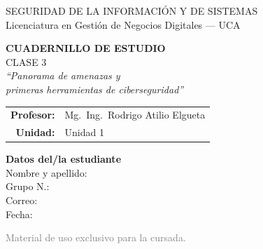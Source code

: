 \documentclass[12pt,a4paper]{article}
\begin{document}
\begin{titlepage}
\centering
\vspace*{1cm}

\begin{cajaTitulo}[width=\textwidth, halign=center]
  SEGURIDAD DE LA INFORMACI\'ON Y DE SISTEMAS\\[4pt]
  {\large Licenciatura en Gesti\'on de Negocios Digitales --- UCA}
\end{cajaTitulo}

\vspace{1.5cm}

{\Huge\bfseries\color{azulUCA} CUADERNILLO DE ESTUDIO}\\[8pt]
{\LARGE\color{doradoUCA} CLASE 3}\\[12pt]
{\Large\itshape ``Panorama de amenazas y\\[2pt] primeras herramientas de ciberseguridad''}\\[1.5cm]

\begin{tabular}{rl}
\textbf{Profesor:}   & Mg.\ Ing.\ Rodrigo Atilio Elgueta \\[4pt]
\textbf{Unidad:}     & Unidad 1 \\[4pt]
\end{tabular}

\vfill

\begin{tcolorbox}[colback=grisClaro, colframe=azulUCA, arc=3mm, width=0.9\textwidth]
  \centering
  {\bfseries Datos del/la estudiante}\\[10pt]
  Nombre y apellido: \underline{\hspace{5cm}}\\[10pt]
  Grupo N.\textdegree: \underline{\hspace{5cm}}\\[10pt]
  Correo: \underline{\hspace{5cm}}\\[10pt]
  Fecha: \underline{\hspace{5cm}}
\end{tcolorbox}

\vspace{1cm}
{\small\textcolor{gray}{Material de uso exclusivo para la cursada.}}
\end{titlepage}

\tableofcontents
\newpage
\end{document}
